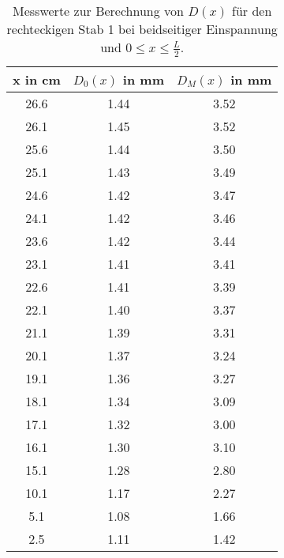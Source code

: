 \begin{table}
  \centering
  \begin{tabular}{c c c}
    \toprule
    x in \si{\centi\meter} & $D_0(x)$ in \si{\milli\meter} & $D_M(x)$ in \si{\milli\meter} \\
    \midrule
    26.6 & 1.44 & 3.52 \\
    26.1 & 1.45 & 3.52 \\
    25.6 & 1.44 & 3.50 \\
    25.1 & 1.43 & 3.49 \\
    24.6 & 1.42 & 3.47 \\
    24.1 & 1.42 & 3.46 \\
    23.6 & 1.42 & 3.44 \\
    23.1 & 1.41 & 3.41 \\
    22.6 & 1.41 & 3.39 \\
    22.1 & 1.40 & 3.37 \\
    21.1 & 1.39 & 3.31 \\
    20.1 & 1.37 & 3.24 \\
    19.1 & 1.36 & 3.27 \\
    18.1 & 1.34 & 3.09 \\
    17.1 & 1.32 & 3.00 \\
    16.1 & 1.30 & 3.10 \\
    15.1 & 1.28 & 2.80 \\
    10.1 & 1.17 & 2.27 \\
    5.1  & 1.08 & 1.66 \\
    2.5  & 1.11 & 1.42 \\
    \bottomrule
  \end{tabular}
  \caption{Messwerte zur Berechnung von $D(x)$ für den rechteckigen Stab 1 bei
  beidseitiger Einspannung und $0\leq x \leq \frac{L}{2}$.}
  \label{tab:messung3a}
\end{table}

